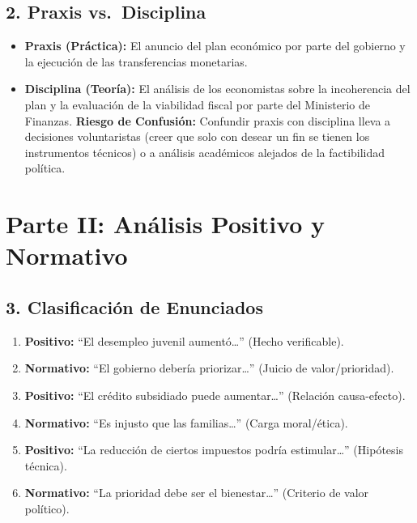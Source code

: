 \documentclass[12pt,spanish]{article}
\providecommand{\tightlist}{%
  \setlength{\itemsep}{0pt}\setlength{\parskip}{0pt}}
\begin{document}
\subsection{2. Praxis vs.~Disciplina}\label{praxis-vs.-disciplina}

\begin{itemize}
\tightlist
\item
  \textbf{Praxis (Práctica):} El anuncio del plan económico por parte
  del gobierno y la ejecución de las transferencias monetarias.
\item
  \textbf{Disciplina (Teoría):} El análisis de los economistas sobre la
  incoherencia del plan y la evaluación de la viabilidad fiscal por
  parte del Ministerio de Finanzas. \textbf{Riesgo de Confusión:}
  Confundir praxis con disciplina lleva a decisiones voluntaristas
  (creer que solo con desear un fin se tienen los instrumentos técnicos)
  o a análisis académicos alejados de la factibilidad política.
\end{itemize}

\section{Parte II: Análisis Positivo y
Normativo}\label{parte-ii-anuxe1lisis-positivo-y-normativo}

\subsection{3. Clasificación de
Enunciados}\label{clasificaciuxf3n-de-enunciados}

\begin{enumerate}
\def\labelenumi{\alph{enumi})}
\tightlist
\item
  \textbf{Positivo:} ``El desempleo juvenil aumentó\ldots{}'' (Hecho
  verificable).
\item
  \textbf{Normativo:} ``El gobierno debería priorizar\ldots{}'' (Juicio
  de valor/prioridad).
\item
  \textbf{Positivo:} ``El crédito subsidiado puede aumentar\ldots{}''
  (Relación causa-efecto).
\item
  \textbf{Normativo:} ``Es injusto que las familias\ldots{}'' (Carga
  moral/ética).
\item
  \textbf{Positivo:} ``La reducción de ciertos impuestos podría
  estimular\ldots{}'' (Hipótesis técnica).
\item
  \textbf{Normativo:} ``La prioridad debe ser el bienestar\ldots{}''
  (Criterio de valor político).
\end{enumerate}
\end{document}
